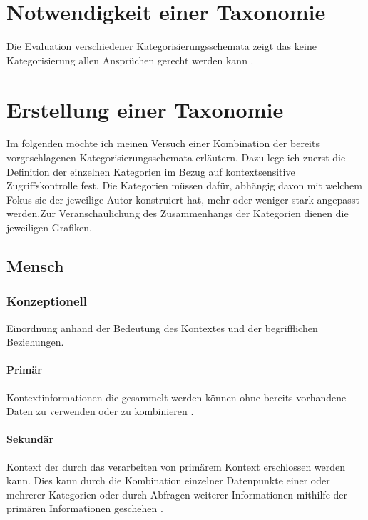 \section{Notwendigkeit einer Taxonomie}
Die Evaluation verschiedener Kategorisierungsschemata zeigt das keine Kategorisierung allen Ansprüchen gerecht werden kann \cite{perera_context_2014}.
\section{ Erstellung einer Taxonomie }
Im folgenden möchte ich meinen Versuch einer Kombination der bereits vorgeschlagenen Kategorisierungsschemata erläutern. Dazu lege ich zuerst die Definition der einzelnen Kategorien im Bezug auf kontextsensitive Zugriffskontrolle fest. Die Kategorien müssen dafür, abhängig davon mit welchem Fokus sie der jeweilige Autor konstruiert hat, mehr oder weniger stark angepasst werden.Zur Veranschaulichung des Zusammenhangs der Kategorien dienen die jeweiligen Grafiken.
\subsection{Mensch}

\subsubsection{Konzeptionell}
Einordnung anhand der Bedeutung des Kontextes und der begrifflichen Beziehungen.
\paragraph{Primär}
Kontextinformationen die gesammelt werden können ohne bereits vorhandene Daten zu verwenden oder zu kombinieren \cite{abowd_towards_1999}. 
\paragraph{Sekundär}
Kontext der durch das verarbeiten von primärem Kontext erschlossen werden kann. Dies kann durch die Kombination einzelner Datenpunkte einer oder mehrerer Kategorien oder durch Abfragen weiterer Informationen mithilfe der primären Informationen geschehen \cite{abowd_towards_1999}.
